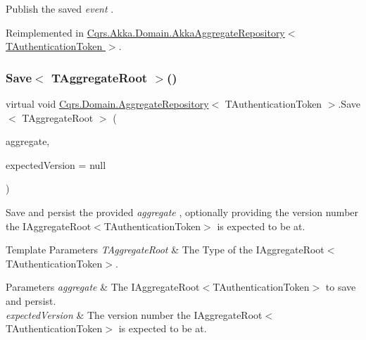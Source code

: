 Publish the saved {\itshape event} . 



Reimplemented in \hyperlink{classCqrs_1_1Akka_1_1Domain_1_1AkkaAggregateRepository_a144cbfdedb23039729ba5b3058f84e7a_a144cbfdedb23039729ba5b3058f84e7a}{Cqrs.\+Akka.\+Domain.\+Akka\+Aggregate\+Repository$<$ T\+Authentication\+Token $>$}.

\mbox{\label{classCqrs_1_1Domain_1_1AggregateRepository_aff9e828d19a091a4275f635bee4b3c9b_aff9e828d19a091a4275f635bee4b3c9b}} 
\subsubsection{\texorpdfstring{Save$<$ T\+Aggregate\+Root $>$()}{Save< TAggregateRoot >()}}
{\footnotesize\ttfamily virtual void \hyperlink{classCqrs_1_1Domain_1_1AggregateRepository}{Cqrs.\+Domain.\+Aggregate\+Repository}$<$ T\+Authentication\+Token $>$.Save$<$ T\+Aggregate\+Root $>$ (\begin{DoxyParamCaption}\item[{T\+Aggregate\+Root}]{aggregate,  }\item[{int?}]{expected\+Version = {\ttfamily null} }\end{DoxyParamCaption})\hspace{0.3cm}{\ttfamily [virtual]}}



Save and persist the provided {\itshape aggregate} , optionally providing the version number the I\+Aggregate\+Root$<$\+T\+Authentication\+Token$>$ is expected to be at. 


\begin{DoxyTemplParams}{Template Parameters}
{\em T\+Aggregate\+Root} & The Type of the I\+Aggregate\+Root$<$\+T\+Authentication\+Token$>$.\\
\hline
\end{DoxyTemplParams}

\begin{DoxyParams}{Parameters}
{\em aggregate} & The I\+Aggregate\+Root$<$\+T\+Authentication\+Token$>$ to save and persist.\\
\hline
{\em expected\+Version} & The version number the I\+Aggregate\+Root$<$\+T\+Authentication\+Token$>$ is expected to be at.\\
\hline
\end{DoxyParams}


